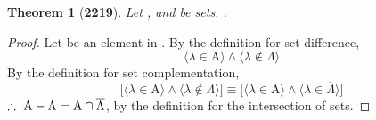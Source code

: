 \documentclass[preview]{standalone}
\newtheorem*{theorem*}{Theorem}
\begin{document}
\begin{theorem*}[\textbf{2219}] \color{black}
    Let , and \bm{$\Lambda$} be sets. 
    .
\end{theorem*}
\begin{proof} \color{black}
    Let \bm{$\lambda$} be an element in . 
    By the definition for set difference,
    \begin{equation*}
        \Big \langle \lambda \in \mathrm{A} \Big \rangle
            \land
        \Big \langle \lambda \notin \Lambda \Big \rangle
    \end{equation*}
    By the definition for set complementation,
    \begin{equation*}
        \bigg[
            \Big \langle \lambda \in \mathrm{A} \Big \rangle
                \land
            \Big \langle \lambda \notin \Lambda \Big \rangle
        \bigg]
            \equiv
        \bigg[
            \Big \langle \lambda \in \mathrm{A} \Big \rangle
                \land
            \Big \langle \lambda \in \overline{\Lambda} \Big \rangle
        \bigg]
    \end{equation*}
    $\therefore \text{\space} \relax{
    \mathrm{A} - \Lambda 
        = 
    \mathrm{A} \cap \overline{\Lambda}
    }$,
    by the definition for the intersection of sets.
\color{lightgray} \end{proof}
\end{document}
